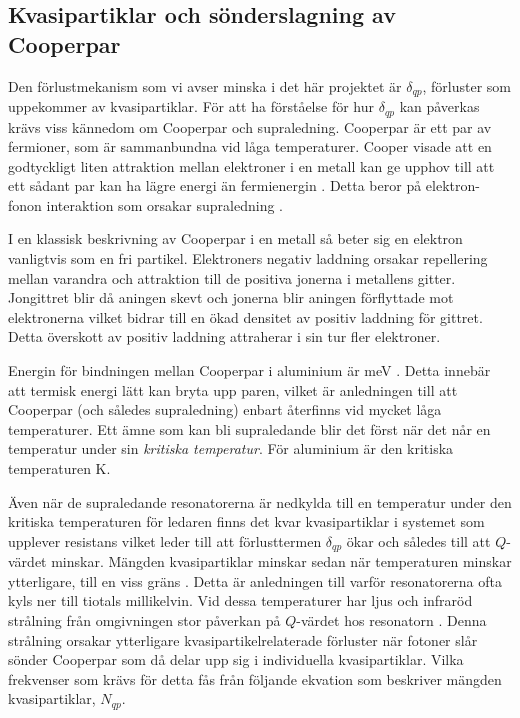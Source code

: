 \documentclass[main.tex]{subfiles}
\begin{document}
\subsection{Kvasipartiklar och sönderslagning av Cooperpar}
\label{sec:cooper}
Den förlustmekanism som vi avser minska i det här projektet är $\delta_{qp}$, förluster som uppekommer av kvasipartiklar. För att ha förståelse för hur $\delta_{qp}$ kan påverkas krävs viss kännedom om Cooperpar och supraledning. Cooperpar är ett par av fermioner, som är sammanbundna vid låga temperaturer. Cooper visade att en godtyckligt liten attraktion mellan elektroner i en metall kan ge upphov till att ett sådant par kan ha lägre energi än fermienergin \cite{Kittel2005}. Detta beror på elektron-fonon interaktion som orsakar supraledning \cite{Kittel2005}.

I en klassisk beskrivning av Cooperpar i en metall så beter sig en elektron vanligtvis som en fri partikel. Elektroners negativ laddning orsakar repellering mellan varandra och attraktion till de positiva jonerna i metallens gitter. Jongittret blir då aningen skevt och jonerna blir aningen förflyttade mot elektronerna vilket bidrar till en ökad densitet av positiv laddning för gittret. Detta överskott av positiv laddning attraherar i sin tur fler elektroner. 

Energin för bindningen mellan Cooperpar i aluminium är \unit[0,39]{meV} \cite{Kittel2005}. Detta innebär att termisk energi lätt kan bryta upp paren, vilket är anledningen till att Cooperpar (och således supraledning) enbart återfinns vid mycket låga temperaturer. Ett ämne som kan bli supraledande blir det först när det når en temperatur under sin \emph{kritiska temperatur}. För aluminium är den kritiska temperaturen \unit[1,2]{K}.





Även när de supraledande resonatorerna är nedkylda till en temperatur under den kritiska temperaturen för ledaren finns det kvar kvasipartiklar i systemet som upplever resistans vilket leder till att förlusttermen $\delta_{qp}$ ökar och således till att $Q$-värdet minskar. Mängden kvasipartiklar minskar sedan när temperaturen minskar ytterligare, till en viss gräns \cite{Barends2011}. Detta är anledningen till varför resonatorerna ofta kyls ner till tiotals millikelvin. Vid dessa temperaturer har ljus och infraröd strålning från omgivningen stor påverkan på $Q$-värdet hos resonatorn \cite{Barends2011}. Denna strålning orsakar ytterligare kvasipartikelrelaterade förluster när fotoner slår sönder Cooperpar som då delar upp sig i individuella kvasipartiklar. Vilka frekvenser som krävs för detta fås från följande ekvation som beskriver mängden kvasipartiklar, $N_{qp}$.
\end{document}
